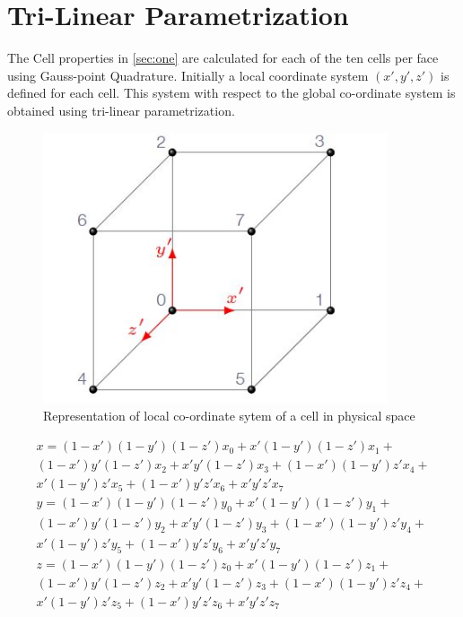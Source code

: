 \section*{Tri-Linear Parametrization}
The Cell properties in \ref{sec:one} are calculated for each of the ten cells per face using Gauss-point Quadrature. Initially a local coordinate system $(x',y',z')$ is defined for each cell. This system with respect to the global co-ordinate system is obtained using tri-linear parametrization. 
\begin{figure}[h]
\centering
\includegraphics[height=8cm]{include/backmatter/tlp.JPG}
\caption{Representation of local co-ordinate sytem of a cell in physical space }
\label{fig:tlpcell}
\end{figure}
\begin{equation}\label{eq:tlm}
 \begin{gathered}
 x=(1-x')(1-y')(1-z')x_0+x'(1-y')(1-z')x_1+\\
 (1-x')y'(1-z')x_2+x'y'(1-z')x_3+(1-x')(1-y')z'x_4+\\
 x'(1-y')z'x_5+(1-x')y'z'x_6+x'y'z'x_7 \\
 y=(1-x')(1-y')(1-z')y_0+x'(1-y')(1-z')y_1+\\
 (1-x')y'(1-z')y_2+x'y'(1-z')y_3+(1-x')(1-y')z'y_4+\\
 x'(1-y')z'y_5+(1-x')y'z'y_6+x'y'z'y_7 \\
 z=(1-x')(1-y')(1-z')z_0+x'(1-y')(1-z')z_1+\\
 (1-x')y'(1-z')z_2+x'y'(1-z')z_3+(1-x')(1-y')z'z_4+\\
 x'(1-y')z'z_5+(1-x')y'z'z_6+x'y'z'z_7 \\
 \end{gathered}
 \end{equation}
